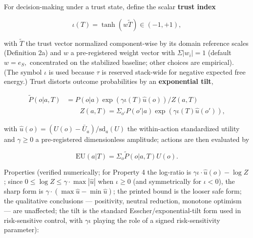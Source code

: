 \documentclass[
]{article}
\begin{document}
For decision-making under a trust state, define the scalar \textbf{trust
index}

\begin{equation}
\iota(T) = \tanh(w \tilde{T}) \in (-1, +1),
\label{eq:iota}
\end{equation}

with \(\tilde{T}\) the trust vector normalized component-wise by its
domain reference scales (Definition 2a) and \(w\) a pre-registered
weight vector with \(\Sigma|w_i| = 1\) (default \(w = e_S,\)
concentrated on the stabilized baseline; other choices are empirical).
(The symbol \(\iota\) is used because \(\tau\) is reserved stack-wide
for negative expected free energy.) Trust distorts outcome probabilities
by an \textbf{exponential tilt},

\begin{equation}
\begin{split}
\tilde{P}(o|a, T) &= P(o|a) \exp(\gamma \iota(T) \hat{u}(o)) / Z(a, T)\\
&\qquad Z(a, T) = \Sigma_{o'} P(o'|a) \exp(\gamma \iota(T) \hat{u}(o')),
\end{split}
\label{eq:tilt}
\end{equation}

with \(\hat{u}(o) = (U(o) - \bar{U}_a)/\mathrm{sd}_a(U)\) the
within-action standardized utility and \(\gamma \geq 0\) a
pre-registered dimensionless amplitude; actions are then evaluated by

\begin{equation}
\mathrm{EU}(a | T) = \Sigma_o \tilde{P}(o|a, T) U(o).
\label{eq:eu}
\end{equation}

Properties (verified numerically; for Property 4 the log-ratio is
\(\gamma\iota\cdot\hat{u}(o) - \log Z\); since
\(0 \leq \log Z \leq \gamma\cdot\max|\hat{u}|\) when \(\iota \geq 0\)
(and symmetrically for \(\iota < 0\)), the sharp form is
\(\gamma\cdot(\max\hat{u} - \min\hat{u})\); the printed bound is the
looser safe form; the qualitative conclusions --- positivity, neutral
reduction, monotone optimism --- are unaffected; the tilt is the
standard Esscher/exponential-tilt form used in risk-sensitive control,
with \(\gamma \iota\) playing the role of a signed risk-sensitivity
parameter):
\end{document}
